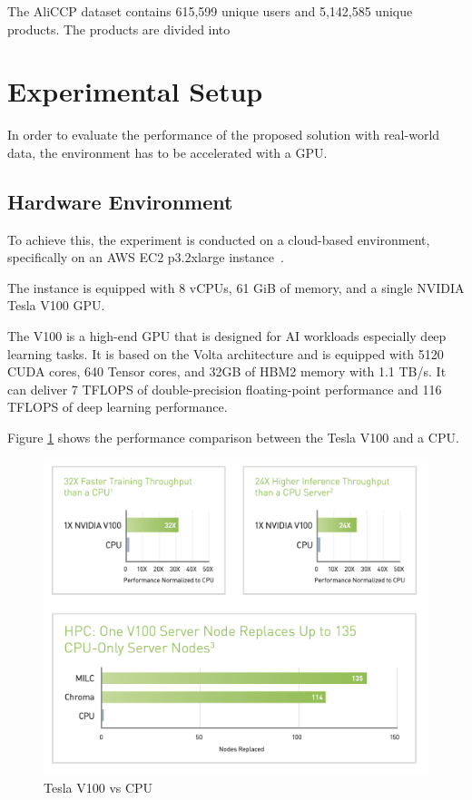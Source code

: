 The AliCCP dataset contains 615,599 unique users and 5,142,585 unique products. The products are divided into 


\section{Experimental Setup}

In order to evaluate the performance of the proposed solution with real-world data, the environment has to be accelerated with a GPU.

\subsection{Hardware Environment}

To achieve this, the experiment is conducted on a cloud-based environment, specifically on an AWS EC2 p3.2xlarge instance~\cite{AwsEc2P3}.

The instance is equipped with 8 vCPUs, 61 GiB of memory, and a single NVIDIA Tesla V100 GPU.

The V100 is a high-end GPU that is designed for AI workloads especially deep learning tasks.
It is based on the Volta architecture and is equipped with 5120 CUDA cores, 640 Tensor cores, and 32GB of HBM2 memory with 1.1 TB/s.
It can deliver 7 TFLOPS of double-precision floating-point performance and 116 TFLOPS of deep learning performance.

Figure \ref{fig: V100vsCPU} shows the performance comparison between the Tesla V100 and a CPU.


\begin{figure}[H]
    \centering
    \includegraphics[width=\textwidth]{assets/v100-vs-cpu.png}
    \caption[Tesla V100 vs CPU]{Tesla V100 vs CPU~\cite{NvidiaV100DataSheet}}
    \label{fig: V100vsCPU}
\end{figure}

